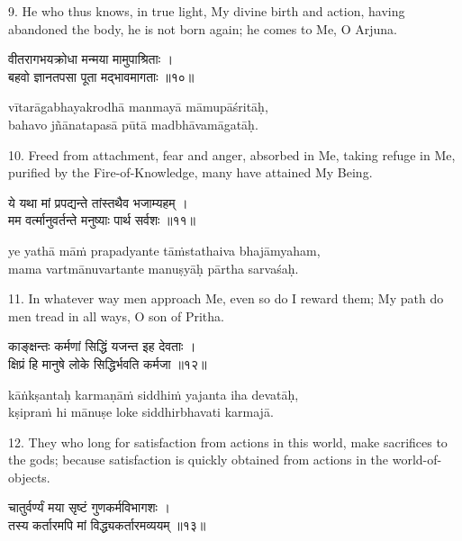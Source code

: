 9. He who thus knows, in true light, My divine birth and action, having
abandoned the body, he is not born again; he comes to Me, O Arjuna.

\begin{gitaverse}
वीतरागभयक्रोधा मन्मया मामुपाश्रिताः । \\
बहवो ज्ञानतपसा पूता मद्भावमागताः ॥१०॥
\end{gitaverse}

\begin{transliteration}
vītarāgabhayakrodhā manmayā māmupāśritāḥ, \\
bahavo jñānatapasā pūtā madbhāvamāgatāḥ.
\end{transliteration}

10. Freed from attachment, fear and anger, absorbed in Me, taking refuge in Me,
purified by the Fire-of-Knowledge, many have attained My Being.

\begin{gitaverse}
ये यथा मां प्रपद्यन्ते तांस्तथैव भजाम्यहम् । \\
मम वर्त्मानुवर्तन्ते मनुष्याः पार्थ सर्वशः ॥११॥
\end{gitaverse}

\begin{transliteration}
ye yathā māṁ prapadyante tāṁstathaiva bhajāmyaham, \\
mama vartmānuvartante manuṣyāḥ pārtha sarvaśaḥ.
\end{transliteration}

11. In whatever way men approach Me, even so do I reward them; My path do men
tread in all ways, O son of Pritha.

\begin{gitaverse}
काङ्क्षन्तः कर्मणां सिद्धिं यजन्त इह देवताः । \\
क्षिप्रं हि मानुषे लोके सिद्धिर्भवति कर्मजा ॥१२॥
\end{gitaverse}

\begin{transliteration}
kāṅkṣantaḥ karmaṇāṁ siddhiṁ yajanta iha devatāḥ, \\
kṣipraṁ hi mānuṣe loke siddhirbhavati karmajā.
\end{transliteration}

12. They who long for satisfaction from actions in this world, make sacrifices
to the gods; because satisfaction is quickly obtained from actions in the
world-of-objects.

\begin{gitaverse}
चातुर्वर्ण्यं मया सृष्टं गुणकर्मविभागशः । \\
तस्य कर्तारमपि मां विद्ध्यकर्तारमव्ययम् ॥१३॥
\end{gitaverse}


